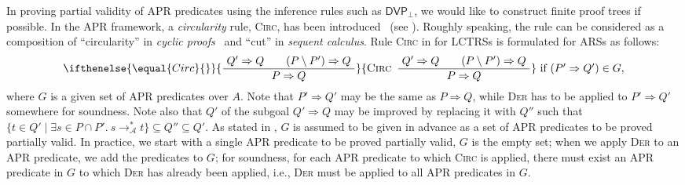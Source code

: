 \documentclass[10pt,a4paper]{article}
\def\cA{\mathcal{A}}
\newcommand{\ReachPred}[2]{#1 \Rightarrow #2}
\newcommand{\RuleName}[1]{{\rm \textsc{#1}}}
\newcommand{\InfRule}[3][]{\ifthenelse{\equal{#1}{}}{\displaystyle\frac{~ #2 ~}{~ #3 ~}}{\mbox{\rm\RuleName{#1}} ~\, \displaystyle\frac{~ #2 ~}{~ #3 ~}
}}
\newcommand{\CDVPnew}[1][]{\mathsf{DVP}_\bot}
\begin{document}
In proving partial validity of APR predicates using the inference rules such as $\CDVPnew$, we would like to construct finite proof trees if possible.
In the APR framework, a \emph{circularity} rule, \RuleName{Circ}, has been introduced~\cite[Definition~12]{CL18} (see ).
Roughly speaking, the rule can be considered as a composition of ``circularity'' in \emph{cyclic proofs}~\cite{Bro05} and ``cut'' in \emph{sequent calculus}.
Rule \RuleName{Circ} in  for LCTRSs is formulated for ARSs as follows:
\[
	\InfRule[Circ]{\ReachPred{Q'}{Q}
		\qquad
		\ReachPred{(P \setminus P')}{Q}
	}{\ReachPred{P}{Q}
	}
	~\mbox{if $(\ReachPred{P'}{Q'}) \in G$,}
\]
where $G$ is a given set of APR predicates over $A$.
Note that $\ReachPred{P'}{Q'}$ may be the same as $\ReachPred{P}{Q}$, while \RuleName{Der} has to be applied to $\ReachPred{P'}{Q'}$ somewhere for soundness.
Note also that $Q'$ of the subgoal $\ReachPred{Q'}{Q}$ may be improved by replacing it with $Q''$ such that $\{ t \in Q' \mid \exists s \in P\cap P'.\ s \mathrel{\to_\cA^*} t \} \subseteq Q'' \subseteq Q'$.
As stated in , $G$ is assumed to be given in advance as a set of APR predicates to be proved partially valid.
In practice, we start with a single APR predicate to be proved partially valid, $G$ is the empty set;
when we apply \RuleName{Der} to an APR predicate, we add the predicates to $G$;
for soundness, for each APR predicate to which \RuleName{Circ} is applied, there must exist an APR predicate in $G$ to which \RuleName{Der} has already been applied, i.e.,
\RuleName{Der} must be applied to all APR predicates in $G$.
\end{document}
